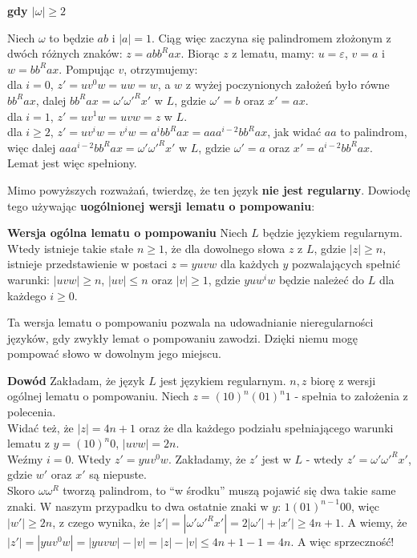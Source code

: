 \documentclass[15pt, a4paper]{article}
\begin{document}
\noindent \textbf{gdy \(|\omega| \geq 2\)}

\vspace{0.5cm}

\noindent Niech \( \omega \) to będzie \(ab\) i \(|a| = 1\). Ciąg więc zaczyna się palindromem złożonym z dwóch różnych znaków: \(z = abb^Rax\). Biorąc \(z\) z lematu, mamy: \(u = \varepsilon \), \( v = a\) i \( w = bb^Rax \). Pompując \(v\), otrzymujemy:\\
dla \(i = 0 \), \(z' = uv^0w = uw = w \), a \(w\) z wyżej poczynionych założeń było równe \(bb^Rax \), dalej  \(bb^Rax = \omega' \omega'^R x' \) w \(L\), gdzie \( \omega' = b \) oraz \(x' = ax\). \\
dla \(i = 1\), \( z' = uv^1w = uvw = z \) w \(L\).\\
dla \(i \geq 2\), \( z' = uv^iw = v^iw = a^ibb^Rax = aaa^{i-2}bb^Rax \), jak widać \( aa \) to palindrom, więc dalej \(aaa^{i-2}bb^Rax = \omega' \omega'^R x' \) w \(L\), gdzie \(\omega' = a\) oraz \( x' = a^{i-2}bb^Rax \).\\
Lemat jest więc spełniony.

\vspace{0.5cm}

\noindent Mimo powyższych rozważań, twierdzę, że ten język \textbf{nie jest regularny}. Dowiodę tego używając \textbf{uogólnionej wersji lematu o pompowaniu}:

\vspace{0.5cm}

\noindent \textbf{Wersja ogólna lematu o pompowaniu}
Niech \(L\) będzie językiem regularnym. Wtedy istnieje takie stałe \(n \geq 1\), że dla dowolnego słowa \(z\) z \(L\), gdzie \(|z| \geq n\), istnieje przedstawienie w postaci \(z = yuvw\) dla każdych \(y\) pozwalających spełnić warunki: \(|uvw| \geq n\), \(|uv| \leq n\) oraz \(|v| \geq 1\), gdzie \(yuw^iw\) będzie należeć do \(L\) dla każdego \(i \geq 0\).

\vspace{0.5cm}

\noindent Ta wersja lematu o pompowaniu pozwala na udowadnianie nieregularności języków, gdy zwykły lemat o pompowaniu zawodzi. Dzięki niemu mogę pompować słowo w dowolnym jego miejscu.

\vspace{0.5cm}

\noindent \textbf{Dowód} Zakładam, że język \(L\) jest językiem regularnym. \(n, z\) biorę z wersji ogólnej lematu o pompowaniu. Niech \(z = (10)^n(01)^n1\) - spełnia to założenia z polecenia. \\
Widać też, że \(|z| = 4n + 1 \) oraz że dla każdego podziału spełniającego warunki lematu z \(y = (10)^n0\), \(|uvw| = 2n\).\\
Weźmy \(i = 0 \). Wtedy \( z' = yuv^0w \). Zakładamy, że \(z'\) jest w \(L\) - wtedy \(z' = \omega' \omega'^Rx'\), gdzie \(w'\) oraz \(x'\) są niepuste.\\
Skoro \( \omega \omega^R \) tworzą palindrom, to "`w środku"' muszą pojawić się dwa takie same znaki. W naszym przypadku to dwa ostatnie znaki w \(y\): \(1(01)^{n-1}00\), więc \(|w'| \geq 2n \), z czego wynika, że \( |z'| = |\omega' \omega'^R x'| = 2|\omega'| + |x'| \geq 4n + 1\). A wiemy, że \(|z'| = |yuv^0w| = |yuvw| - |v| = |z| - |v| \leq 4n + 1 - 1 = 4n \). A więc sprzeczność!
\end{document}
